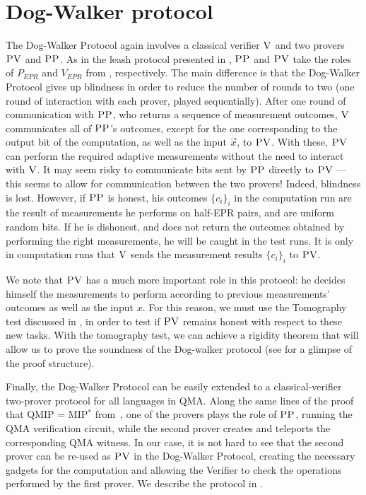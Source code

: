 \documentclass{toc}
\newcommand{\ver}{\textsc{V}}
\newcommand{\pv}{\textsc{PV}}
\newcommand{\pp}{\textsc{PP}}
\begin{document}
\section{Dog-Walker protocol}
\label{sec:dog-walker}
The Dog-Walker Protocol again involves a classical verifier $\ver$ and two provers $\pv$ and $\pp$. As in the leash protocol presented in , $\pp$ and $\pv$ take the roles of $P_{EPR}$ and $V_{EPR}$ from \cite{broadbent15howtoverify}, respectively. %
The main difference is that the Dog-Walker Protocol gives up blindness in order to reduce the number of rounds to two (one round of interaction with each prover, played sequentially). After 
one
round of communication with $\pp$, who returns a sequence of measurement outcomes, $\ver$ communicates all of $\pp$'s outcomes, except for the one corresponding to the output bit of the computation, as well as the input 
$\vec{x}$,
to $\pv$.  
With 
these, $\pv$ can perform the required adaptive measurements without the need to interact with 
$\ver$.
It may seem risky to communicate bits sent by $\pp$ directly to $\pv$ --- this seems to allow for communication between the two provers! Indeed, blindness is lost. However, if $\pp$ is honest, his outcomes $\{c_i\}_i$ in the computation run are the result of measurements he performs on half-EPR pairs, and are uniform random bits. If he is dishonest, and does not return the outcomes  obtained by performing the right measurements, he will be caught in the test runs. It is only in computation runs that $\ver$ sends the measurement results $\{c_i\}_i$ to $\pv$. 

We note that $\pv$ has a much more important role in this protocol: he
decides himself the measurements to perform according to previous measurements'
outcomes as well as the input $x$. For this reason, we must use the Tomography test
discussed in , in order to test if $\pv$ remains
honest with respect to these new tasks.  With the tomography test, we can achieve a
rigidity theorem that will allow us to prove the soundness of the Dog-walker
protocol
(see  for a glimpse of the proof
structure).


Finally, the Dog-Walker Protocol can be easily extended to a classical-verifier  two-prover protocol for all languages in QMA. 
Along the same lines of the proof that QMIP = MIP$^*$ from~\cite{reichardt2012classical}, one of the provers plays the role of $\pp$, running the  QMA verification circuit, while the second prover creates and teleports the corresponding QMA witness. In our case, it is not hard to see that the second prover can be  re-used as $\pv$ in the Dog-Walker Protocol, creating the necessary gadgets for the computation and allowing the Verifier to check the operations performed by the first prover.  We describe the protocol in .
\end{document}
